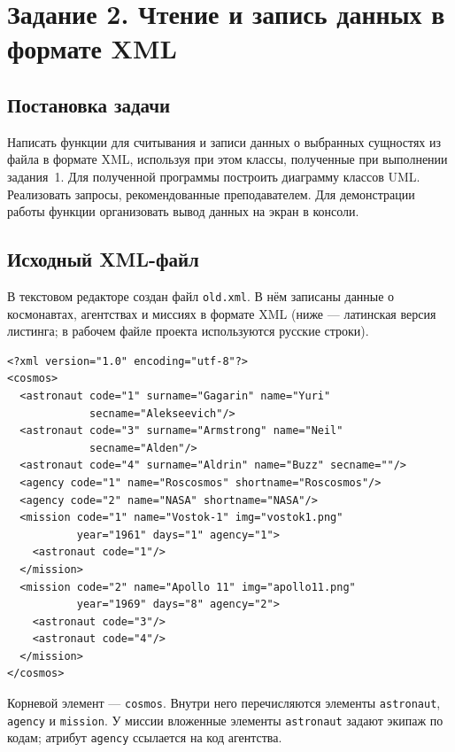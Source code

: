 \documentclass[a4paper,14pt]{extarticle}
\begin{document}
\clearpage
\section{Задание 2. Чтение и запись данных в формате XML}

\subsection{Постановка задачи}

Написать функции для считывания и записи данных о выбранных сущностях из файла в формате XML, используя при этом классы, полученные при выполнении задания~1. Для полученной программы построить диаграмму классов UML. Реализовать запросы, рекомендованные преподавателем. Для демонстрации работы функции организовать вывод данных на экран в консоли.

\subsection{Исходный XML-файл}

В текстовом редакторе создан файл \texttt{old.xml}. В нём записаны данные о космонавтах, агентствах и миссиях в формате XML (ниже --- латинская версия листинга; в рабочем файле проекта используются русские строки).

\begin{lstlisting}[language={},caption={Файл \texttt{old.xml} (фрагмент структуры)}]
<?xml version="1.0" encoding="utf-8"?>
<cosmos>
  <astronaut code="1" surname="Gagarin" name="Yuri"
             secname="Alekseevich"/>
  <astronaut code="3" surname="Armstrong" name="Neil"
             secname="Alden"/>
  <astronaut code="4" surname="Aldrin" name="Buzz" secname=""/>
  <agency code="1" name="Roscosmos" shortname="Roscosmos"/>
  <agency code="2" name="NASA" shortname="NASA"/>
  <mission code="1" name="Vostok-1" img="vostok1.png"
           year="1961" days="1" agency="1">
    <astronaut code="1"/>
  </mission>
  <mission code="2" name="Apollo 11" img="apollo11.png"
           year="1969" days="8" agency="2">
    <astronaut code="3"/>
    <astronaut code="4"/>
  </mission>
</cosmos>
\end{lstlisting}

Корневой элемент --- \texttt{cosmos}. Внутри него перечисляются элементы \texttt{astronaut}, \texttt{agency} и \texttt{mission}. У миссии вложенные элементы \texttt{astronaut} задают экипаж по кодам; атрибут \texttt{agency} ссылается на код агентства.
\end{document}
